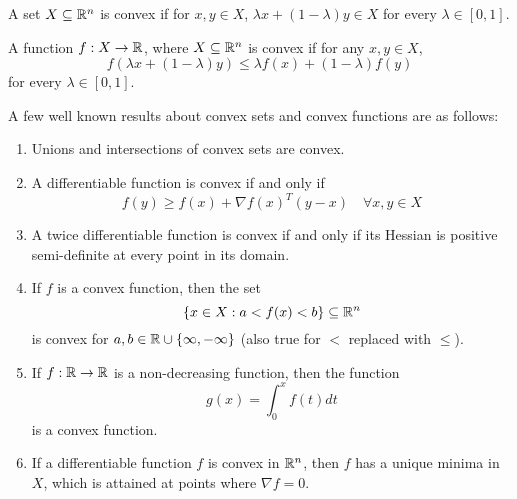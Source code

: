 \begin{definition}
	A set $X\subseteq \mathbb{R}^n$ is convex if for $x,y\in X$,
	$\lambda x + (1-\lambda)y \in X$ for every $\lambda \in [0,1]$.
\end{definition}


\begin{definition}
	A function $f:X\rightarrow \mathbb{R}$, where $X\subseteq \mathbb{R}^n$ is
	convex if for any $x,y\in X$,
	\[
		f(\lambda x + (1-\lambda)y) \leq \lambda f(x) + (1-\lambda)f(y)
	\]
	for every $\lambda \in [0,1]$.
\end{definition}


A few well known results about convex sets and
convex functions are as follows:
\begin{enumerate}
	\item Unions and intersections of convex sets are convex.

	\item A differentiable function is convex if and only if
	\[
		f(y)\geq f(x) + \nabla f(x)^T (y-x)\quad \forall x,y\in X
	\]

	\item A twice differentiable function is convex if and only if
	its Hessian is positive semi-definite at every point in its
	domain.

	\item If $f$ is a convex function, then the set
	\[
		\{x\in X: a< f(x) < b\}\subseteq \mathbb{R}^n
	\]
	is convex for $a,b\in \mathbb{R}\cup\{\infty,-\infty\}$ (also true
	for $<$ replaced with $\leq$).

	\item If $f:\mathbb{R}\rightarrow \mathbb{R}$ is a non-decreasing function,
	then the function
	\[
		g(x) = \int_{0}^x f(t)dt
	\]
	is a convex function.

	\item If a differentiable function $f$ is convex in $\mathbb{R}^n$,
	then $f$ has a unique minima in $X$, which is attained at points
	where $\nabla f = 0$.
\end{enumerate}
